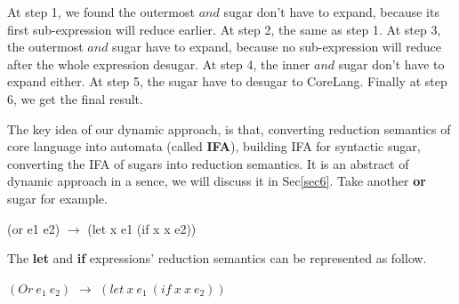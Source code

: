 At step 1, we found the outermost $and$ sugar don't have to expand, because its first sub-expression will reduce earlier. At step 2, the same as step 1. At step 3, the outermost $and$ sugar have to expand, because no sub-expression will reduce after the whole expression desugar. At step 4, the inner $and$ sugar don't have to expand either. At step 5, the sugar have to desugar to CoreLang. Finally at step 6, we get the final result.

The key idea of our dynamic approach, is that, converting reduction semantics of core language into automata (called {\bfseries IFA}), building IFA for syntactic sugar, converting the IFA of sugars into reduction semantics. It is an abstract of dynamic approach in a sence, we will discuss it in Sec\ref{sec6}. Take another {\bfseries or} sugar for example.
\begin{flushleft}
	(or e1 e2) $\rightarrow$ (let x e1 (if x x e2))
\end{flushleft}  
The {\bfseries let} and {\bfseries if} expressions' reduction semantics can be represented as follow.




$(Or~e_1~e_2)$ $\rightarrow$ $(let~x~e_1~(if~x~x~e_2))$

